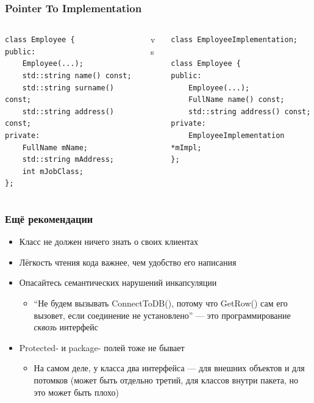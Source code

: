 \documentclass[xetex,mathserif,serif]{beamer}
\begin{document}
\begin{frame}[fragile]
	\frametitle{Pointer To Implementation}
	\begin{columns}
		\begin{column}{0.32\textwidth}
			\begin{footnotesize}
				\begin{verbatim}
class Employee {
public:
    Employee(...);
    std::string name() const;
    std::string surname() const;
    std::string address() const;
private:
    FullName mName;
    std::string mAddress;
    int mJobClass;
};
				\end{verbatim}
			\end{footnotesize}
		\end{column}
		\begin{column}{0.02\textwidth}
			vs
		\end{column}
		\begin{column}{0.45\textwidth}
			\begin{footnotesize}
				\begin{verbatim}
class EmployeeImplementation;

class Employee {
public:
    Employee(...);
    FullName name() const;
    std::string address() const;
private:
    EmployeeImplementation *mImpl;
};
				\end{verbatim}
			\end{footnotesize}
		\end{column}
	\end{columns}
\end{frame}

	\begin{frame}
		\frametitle{Ещё рекомендации}
		\begin{itemize}
			\item Класс не должен ничего знать о своих клиентах
			\item Лёгкость чтения кода важнее, чем удобство его написания
			\item Опасайтесь семантических нарушений инкапсуляции
			\begin{itemize}
				\item ``Не будем вызывать ConnectToDB(), потому что GetRow() сам его вызовет, если соединение не установлено'' --- это программирование \textit{сквозь} интерфейс
			\end{itemize}
			\item Protected- и package- полей тоже не бывает
			\begin{itemize}
				\item На самом деле, у класса два интерфейса --- для внешних объектов и для потомков (может быть отдельно третий, для классов внутри пакета, но это может быть плохо)
			\end{itemize}
		\end{itemize}
	\end{frame}
\end{document}
